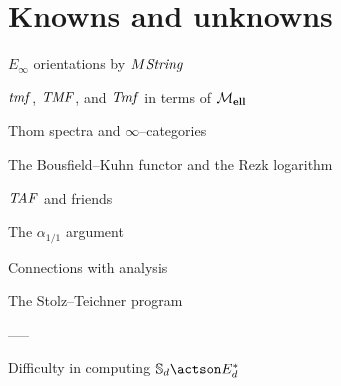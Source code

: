 
\chapter{Knowns and unknowns}


$E_\infty$ orientations by $M\mathit{String}$

$\mathit{tmf}$, $\mathit{TMF}$, and $\mathit{Tmf}$ in terms of $\mathcal{M}_{\mathbf{ell}}$

Thom spectra and $\infty$--categories

The Bousfield--Kuhn functor and the Rezk logarithm



$\mathit{TAF}$ and friends

The $\alpha_{1/1}$ argument




Connections with analysis

The Stolz--Teichner program






-----

Difficulty in computing $\S_d \actson E_d^*$

